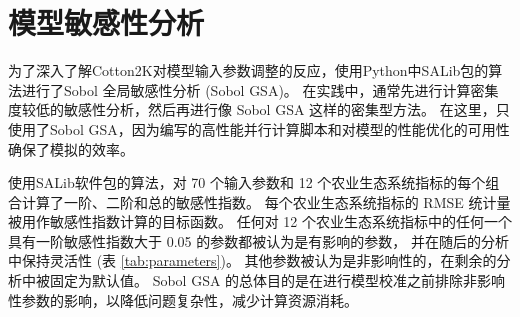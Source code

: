 \chapter{模型敏感性分析}\label{chap:sa}
\begin{spacing}{}
    为了深入了解Cotton2K对模型输入参数调整的反应，使用Python中SALib包的算法进行了Sobol 全局敏感性分析 (Sobol GSA)。%
    在实践中，通常先进行计算密集度较低的敏感性分析，然后再进行像 Sobol GSA 这样的密集型方法。%
    在这里，只使用了Sobol GSA，因为编写的高性能并行计算脚本和对模型的性能优化的可用性确保了模拟的效率。

    使用SALib软件包的算法，对 70 个输入参数和 12 个农业生态系统指标的每个组合计算了一阶、二阶和总的敏感性指数。%
    每个农业生态系统指标的 RMSE 统计量被用作敏感性指数计算的目标函数。%
    任何对 12 个农业生态系统指标中的任何一个具有一阶敏感性指数大于 0.05 的参数都被认为是有影响的参数，%
    并在随后的分析中保持灵活性 (表 \ref{tab:parameters})。%
    其他参数被认为是非影响性的，在剩余的分析中被固定为默认值。%
    Sobol GSA 的总体目的是在进行模型校准之前排除非影响性参数的影响，以降低问题复杂性，减少计算资源消耗。

\end{spacing}
